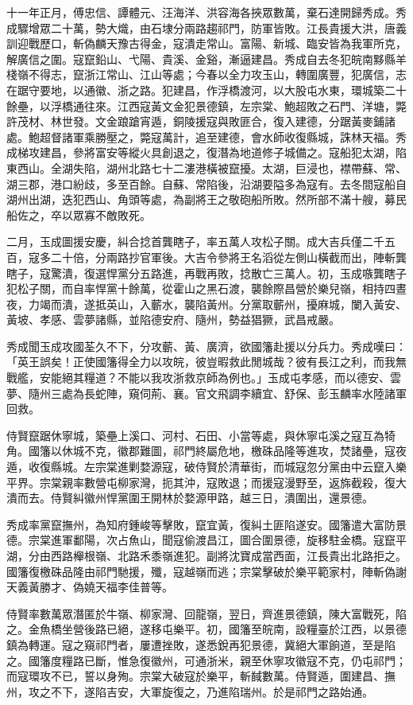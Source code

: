 \begin{pinyinscope}
十一年正月，傅忠信、譚體元、汪海洋、洪容海各挾眾數萬，棄石達開歸秀成。秀成驟增眾二十萬，勢大熾，由石埭分兩路趨祁門，防軍皆敗。江長貴援大洪，唐義訓迎戰歷口，斬偽麟天豫古得金，寇潰走常山。富陽、新城、臨安皆為我軍所克，解廣信之圍。寇竄鉛山、弋陽、貴溪、金谿，漸逼建昌。秀成自去冬犯皖南黟縣羊棧嶺不得志，竄浙江常山、江山等處；今春以全力攻玉山，轉圍廣豐，犯廣信，志在踞守要地，以通徽、浙之路。犯建昌，作浮橋渡河，以大股屯水東，環城築二十餘壘，以浮橋通往來。江西寇黃文金犯景德鎮，左宗棠、鮑超敗之石門、洋塘，斃許茂材、林世發。文金踉蹌宵遁，銅陵援寇與敗匪合，復入建德，分踞黃麥鋪諸處。鮑超督諸軍乘勝壓之，斃寇萬計，追至建德，會水師收復縣城，誅林天福。秀成梯攻建昌，參將富安等縱火具創退之，復潛為地道修子城備之。寇船犯太湖，陷東西山。全湖失陷，湖州北路七十二漊港橫被竄擾。太湖，巨浸也，襟帶蘇、常、湖三郡，港口紛歧，多至百餘。自蘇、常陷後，沿湖要隘多為寇有。去冬間寇船自湖州出湖，迭犯西山、角頭等處，為副將王之敬砲船所敗。然所部不滿十艘，募民船佐之，卒以眾寡不敵敗死。

二月，玉成圖援安慶，糾合捻首龔瞎子，率五萬人攻松子關。成大吉兵僅二千五百，寇多二十倍，分兩路抄官軍後。大吉令參將王名滔從左側山橫截而出，陣斬龔瞎子，寇驚潰，復選悍黨分五路進，再戰再敗，捻散亡三萬人。初，玉成嗾龔瞎子犯松子關，而自率悍黨十餘萬，從霍山之黑石渡，襲餘際昌營於樂兒嶺，相持四晝夜，力竭而潰，遂抵英山，入蘄水，襲陷黃州。分黨取蘄州，擾麻城，闌入黃安、黃坡、孝感、雲夢諸縣，並陷德安府、隨州，勢益猖獗，武昌戒嚴。

秀成聞玉成攻國荃久不下，分攻蘄、黃、廣濟，欲國籓赴援以分兵力。秀成嘆曰：「英王誤矣！正使國籓得全力以攻皖，彼豈暇救此閒城哉？彼有長江之利，而我無戰艦，安能絕其糧道？不能以我攻浙救京師為例也。」玉成屯孝感，而以德安、雲夢、隨州三處為長蛇陣，窺伺荊、襄。官文飛調李續宜、舒保、彭玉麟率水陸諸軍回救。

侍賢竄踞休寧城，築壘上溪口、河村、石田、小當等處，與休寧屯溪之寇互為犄角。國籓以休城不克，徽郡難圖，祁門終屬危地，檄硃品隆等進攻，焚諸壘，寇夜遁，收復縣城。左宗棠進剿婺源寇，破侍賢於清華街，而城寇忽分黨由中云竄入樂平界。宗棠親率數營屯柳家灣，扼其沖，寇敗退；而援寇漫野至，返旆截殺，復大潰而去。侍賢糾徽州悍黨圍王開林於婺源甲路，越三日，潰圍出，還景德。

秀成率黨竄撫州，為知府鍾峻等擊敗，竄宜黃，復糾土匪陷遂安。國籓遣大富防景德。宗棠進軍鄱陽，次占魚山，聞寇偷渡昌江，圖合圍景德，旋移駐金橋。寇竄平湖，分由西路櫸根嶺、北路禾黍嶺進犯。副將沈寶成當西面，江長貴出北路拒之。國籓復檄硃品隆由祁門馳援，殲，寇越嶺而逃；宗棠擊破於樂平範家村，陣斬偽謝天義黃勝才、偽嬈天福李佳普等。

侍賢率數萬眾潛匿於牛嶺、柳家灣、回龍嶺，翌日，齊進景德鎮，陳大富戰死，陷之。金魚橋坐營後路已絕，遂移屯樂平。初，國籓至皖南，設糧臺於江西，以景德鎮為轉運。寇之窺祁門者，屢遭挫敗，遂悉銳再犯景德，冀絕大軍餉道，至是陷之。國籓度糧路已斷，惟急復徽州，可通浙米，親至休寧攻徽寇不克，仍屯祁門；而寇環攻不已，誓以身殉。宗棠大破寇於樂平，斬馘數萬。侍賢遁，圍建昌、撫州，攻之不下，遂陷吉安，大軍旋復之，乃進陷瑞州。於是祁門之路始通。


\end{pinyinscope}
